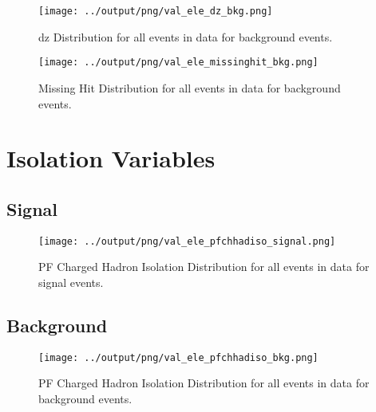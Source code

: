 \documentclass[11pt]{book}
\begin{document}
\begin{figure}[htb]
\centering
\texttt{[image: ../output/png/val\_ele\_dz\_bkg.png]}
\caption{dz Distribution for all events in data for background events.}
\label{fig:val_ele_dz_bkg}
\end{figure}

\begin{figure}[htb]
\centering
\texttt{[image: ../output/png/val\_ele\_missinghit\_bkg.png]}
\caption{Missing Hit Distribution for all events in data for background events.}
\label{fig:val_ele_missinghit_bkg}
\end{figure}
\clearpage


\chapter{Isolation Variables}

\section{Signal}
\begin{figure}[htb]
\centering
\texttt{[image: ../output/png/val\_ele\_pfchhadiso\_signal.png]}
\caption{PF Charged Hadron Isolation Distribution for all events in data for signal events.}
\label{fig:val_ele_pfchhadiso_signal}
\end{figure}

\clearpage

\section{Background}
\begin{figure}[htb]
\centering
\texttt{[image: ../output/png/val\_ele\_pfchhadiso\_bkg.png]}
\caption{PF Charged Hadron Isolation Distribution for all events in data for background events.}
\label{fig:val_ele_pfchhadiso_bkg}
\end{figure}
\end{document}

